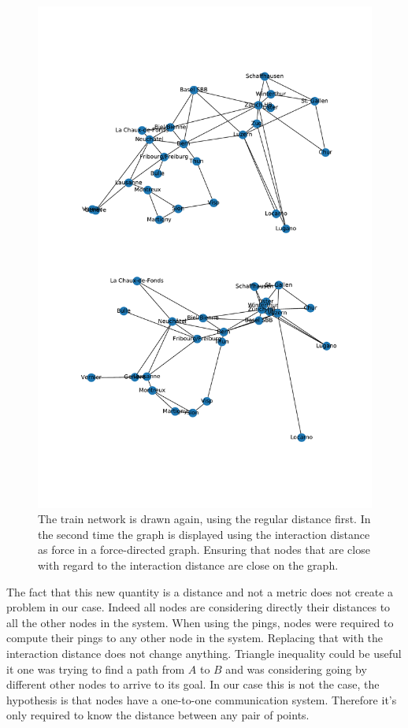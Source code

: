 \documentclass[a4paper,11pt,oneside]{report}
\begin{document}
\begin{figure}[!h] 
\centering
\includegraphics[width=350pt]{figures/CFF-NewDistances}
\caption{The train network is drawn again, using the regular distance first. In
    the second time the graph is displayed using the interaction distance as
    force in a force-directed graph. Ensuring that nodes that are close with
    regard to the interaction distance are close on the graph.}
    \label{fig:CFF-NewDistances}
\end{figure}

The fact that this new quantity is a distance and not a metric does not create
a problem in our case. Indeed all nodes are considering directly their distances
to all the other nodes in the system. When using the pings, nodes were required
to compute their pings to any other node in the system. Replacing that with the
interaction distance does not change anything. Triangle inequality could be
useful it one was trying to find a path from $A$ to $B$ and was considering going by different other nodes to arrive to its goal. In our case this is not
the case, the hypothesis is that nodes have a one-to-one communication system.
Therefore it's only required to know the distance between any pair of points.
\end{document}
